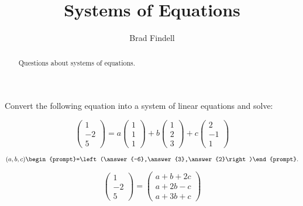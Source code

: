 \documentclass{ximera}
\title{Systems of Equations}
\author{Brad Findell}
\begin{document}
\begin{abstract}
Questions about systems of equations. 
\end{abstract}
\maketitle



\problemlabel

\noindent Convert the following equation into a system of linear equations and solve: 

\[
\left(\begin{array}{r} 1 \\ -2 \\ 5 \end{array} \right) 
= a\left(\begin{array}{r} 1 \\ 1 \\ 1 \end{array} \right) 
+ b\left(\begin{array}{r} 1 \\ 2 \\ 3 \end{array} \right) 
+ c\left(\begin{array}{r} 2 \\ -1 \\ 1 \end{array} \right)
\]

\begin{exercise}

$(a,b,c)\begin{prompt}=\left(\answer{-6},\answer{3},\answer{2}\right)\end{prompt}.$

\begin{hint}
\[
\left(\begin{array}{r} 1 \\ -2 \\ 5 \end{array} \right) 
= \left(\begin{array}{c} a+b+2c \\ a+2b-c \\ a+3b+c \end{array} \right) 
\]
\end{hint}

\end{exercise}

\problemlabel
\end{document}
